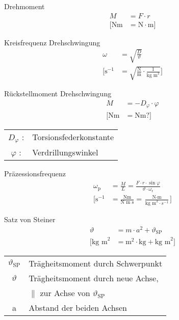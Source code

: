\begin{karte}{Drehmoment}
    \begin{align*}
        M &= F \cdot r \\
        \bigg[ \text{Nm} &=
            \text{N} \cdot \text{m}
            \bigg]
    \end{align*}
\end{karte}

\begin{karte}{Kreisfrequenz Drehschwingung}
    \begin{align*}
        \omega &= \sqrt{\frac{D}{\vartheta}} \\
        \bigg[ \text{s}^{-1} &=  \sqrt{ \frac{\text{N}}{\text{m}} \cdot \frac{1}{\text{kg m}^2 }}
            \bigg]
    \end{align*}
\end{karte}

\begin{karte}{Rückstellmoment Drehschwingung}
    \begin{align*}
        M &= -D_\varphi \cdot \varphi \\
        [ \text{Nm} &= \text{Nm?} ]
    \end{align*}
    \begin{tabular}[t]{cl}
        \(D_\varphi\) :& Torsionsfederkonstante \\
        \(\varphi\) :& Verdrillungswinkel
    \end{tabular}
\end{karte}

\begin{karte}{Präzessionsfrequenz}
     \begin{align*}
         \omega_\text{p} &= \frac{M}{L} = \frac{ F \cdot r \cdot \sin \varphi }{ \vartheta \cdot \omega_\text{r}} \\
         \bigg[ \text{s}^{-1} &= \frac{\text{Nm}}{\text{N m s}} 
             = \frac{\text{N} \cdot \text{m}}{\text{kg m}^2 \cdot s^{-1}}
            \bigg]
     \end{align*}
\end{karte}

\begin{karte}{Satz von Steiner}
    \begin{align*}
        \vartheta &= m \cdot a^2 + \vartheta_{\text{SP}} \\
        \bigg[ \text{kg m}^2 &=
            \text{m}^2 \cdot \text{kg} + \text{kg m}^2
            \bigg]
    \end{align*}
    \begin{tabular}[t]{cl}
        \(\vartheta_\text{SP}\) & Trägheitsmoment durch Schwerpunkt \\
        \(\vartheta\) & Trägheitsmoment durch neue Achse, \\
        &\(\parallel\) zur Achse von \(\vartheta_\text{SP}\) \\
        a & Abstand der beiden Achsen
    \end{tabular}
\end{karte}

